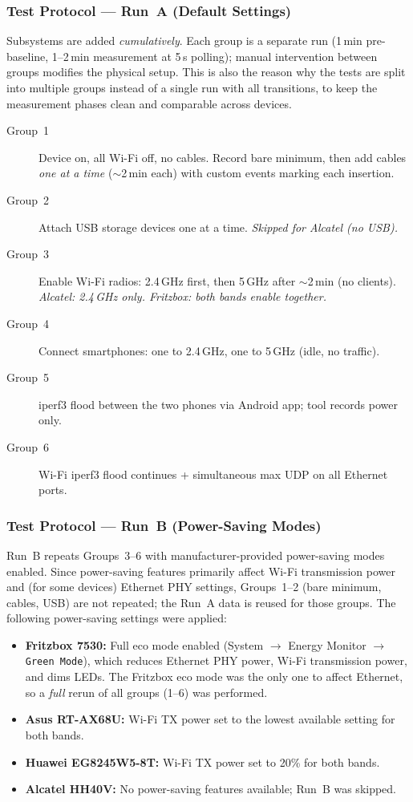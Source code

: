 \subsubsection{Test Protocol --- Run~A (Default Settings)}
Subsystems are added \emph{cumulatively}. Each group is a separate run (1\,min pre-baseline, 1--2\,min measurement at 5\,s polling); manual intervention between groups modifies the physical setup. This is also the reason why the tests are split into multiple groups instead of a single run with all transitions, to keep the measurement phases clean and comparable across devices.

\begin{description}
    \item[Group~1] Device on, all Wi-Fi off, no cables. Record bare minimum, then add cables \emph{one at a time} ($\sim$2\,min each) with custom events marking each insertion.
    \item[Group~2] Attach \ac{USB} storage devices one at a time. \emph{Skipped for Alcatel (no \ac{USB}).}
    \item[Group~3] Enable Wi-Fi radios: 2.4\,GHz first, then 5\,GHz after $\sim$2\,min (no clients). \emph{Alcatel: 2.4\,GHz only. Fritzbox: both bands enable together.}
    \item[Group~4] Connect smartphones: one to 2.4\,GHz, one to 5\,GHz (idle, no traffic).
    \item[Group~5] iperf3 flood between the two phones via Android app; tool records power only.
    \item[Group~6] Wi-Fi iperf3 flood continues + simultaneous max \ac{UDP} on all Ethernet ports.
\end{description}

\subsubsection{Test Protocol --- Run~B (Power-Saving Modes)}
Run~B repeats Groups~3--6 with manufacturer-provided power-saving modes enabled.
Since power-saving features primarily affect Wi-Fi transmission power and (for some devices) Ethernet \ac{PHY} settings, Groups~1--2 (bare minimum, cables, \ac{USB}) are not repeated; the Run~A data is reused for those groups.
The following power-saving settings were applied:
\begin{itemize}
    \item \textbf{Fritzbox 7530:} Full eco mode enabled (System $\rightarrow$ Energy Monitor $\rightarrow$ \texttt{Green Mode}), which reduces Ethernet \ac{PHY} power, Wi-Fi transmission power, and dims LEDs.
    The Fritzbox eco mode was the only one to affect Ethernet, so a \emph{full} rerun of all groups (1--6) was performed.
    \item \textbf{Asus RT-AX68U:} Wi-Fi TX power set to the lowest available setting for both bands.
    \item \textbf{Huawei EG8245W5-8T:} Wi-Fi TX power set to 20\% for both bands.
    \item \textbf{Alcatel HH40V:} No power-saving features available; Run~B was skipped.
\end{itemize}

